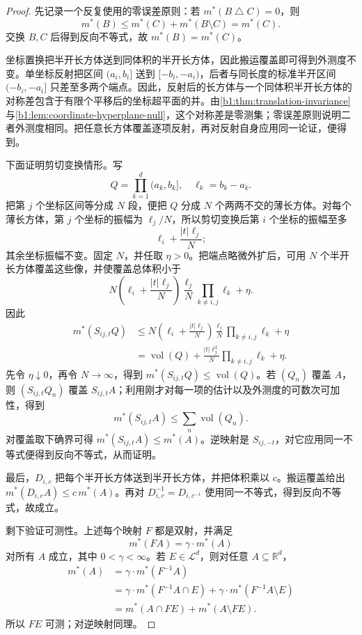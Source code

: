 \begin{proof}
先记录一个反复使用的零误差原则：若
\(m^*(B\mathbin{\triangle}C)=0\)，则
\[
m^*(B)\leq m^*(C)+m^*(B\setminus C)=m^*(C).
\]
交换 \(B,C\) 后得到反向不等式，故 \(m^*(B)=m^*(C)\)。

坐标置换把半开长方体送到同体积的半开长方体，因此搬运覆盖即可得到外测度不变。单坐标反射把区间 \((a_i,b_i]\) 送到 \([-b_i,-a_i)\)，后者与同长度的标准半开区间 \((-b_i,-a_i]\) 只差至多两个端点。因此，反射后的长方体与一个同体积半开长方体的对称差包含于有限个平移后的坐标超平面的并。由\cref{b1:thm:translation-invariance}与\cref{b1:lem:coordinate-hyperplane-null}，这个对称差是零测集；零误差原则说明二者外测度相同。把任意长方体覆盖逐项反射，再对反射自身应用同一论证，便得到。

下面证明剪切变换情形。写
\[
Q=\prod_{k=1}^{d}(a_k,b_k],
\quad \ell_k=b_k-a_k.
\]
把第 \(j\) 个坐标区间等分成 \(N\) 段，便把 \(Q\) 分成 \(N\) 个两两不交的薄长方体。对每个薄长方体，第 \(j\) 个坐标的振幅为 \(\ell_j/N\)，所以剪切变换后第 \(i\) 个坐标的振幅至多
\[
\ell_i+\frac{|t|\ell_j}{N};
\]
其余坐标振幅不变。固定 \(N\)，并任取 \(\eta>0\)。把端点略微外扩后，可用 \(N\) 个半开长方体覆盖这些像，并使覆盖总体积小于
\[
N\left(\ell_i+\frac{|t|\ell_j}{N}\right)
\frac{\ell_j}{N}
\prod_{k\ne i,j}\ell_k+\eta.
\]
因此
\begin{align*}
m^*(S_{ij,t}Q)
&\leq N\left(\ell_i+\frac{|t|\ell_j}{N}\right)
\frac{\ell_j}{N}
\prod_{k\ne i,j}\ell_k+\eta\\
&=\operatorname{vol}(Q)
+\frac{|t|\ell_j^2}{N}\prod_{k\ne i,j}\ell_k+\eta.
\end{align*}
先令 \(\eta\downarrow0\)，再令 \(N\to\infty\)，得到
\(m^*(S_{ij,t}Q)\leq\operatorname{vol}(Q)\)。若 \((Q_n)\) 覆盖 \(A\)，则 \((S_{ij,t}Q_n)\) 覆盖 \(S_{ij,t}A\)；利用刚才对每一项的估计以及外测度的可数次可加性，得到
\[
m^*(S_{ij,t}A)\leq\sum_n\operatorname{vol}(Q_n).
\]
对覆盖取下确界可得 \(m^*(S_{ij,t}A)\leq m^*(A)\)。逆映射是 \(S_{ij,-t}\)，对它应用同一不等式便得到反向不等式，从而证明。

最后，\(D_{i,c}\) 把每个半开长方体送到半开长方体，并把体积乘以 \(c\)。搬运覆盖给出
\(m^*(D_{i,c}A)\leq c\,m^*(A)\)。再对 \(D_{i,c}^{-1}=D_{i,c^{-1}}\) 使用同一不等式，得到反向不等式，故成立。

剩下验证可测性。上述每个映射 \(F\) 都是双射，并满足
\[
m^*(F A)=\gamma\cdot m^*(A)
\]
对所有 \(A\) 成立，其中 \(0<\gamma<\infty\)。若 \(E\in\mathcal L^d\)，则对任意 \(A\subseteq\mathbb R^d\)，
\begin{align*}
m^*(A)
&=\gamma\cdot m^*(F^{-1}A)\\
&=\gamma\cdot m^*(F^{-1}A\cap E)
+\gamma\cdot m^*(F^{-1}A\setminus E)\\
&=m^*(A\cap FE)+m^*(A\setminus FE).
\end{align*}
所以 \(FE\) 可测；对逆映射同理。
\end{proof}

